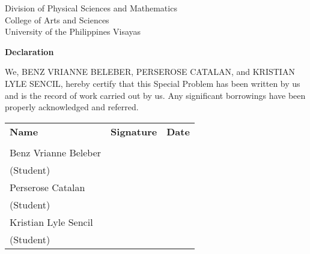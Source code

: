 \begin{center}
	Division of Physical Sciences and Mathematics\\
	College of Arts and Sciences\\
	University of the Philippines Visayas 
	
		\textbf{Declaration}
		\end{center}

We,  {BENZ VRIANNE BELEBER}, {PERSEROSE CATALAN}, and {KRISTIAN LYLE SENCIL}, hereby certify that this Special Problem has been written by us  and is the record of work carried out by us. Any significant borrowings have been properly acknowledged and referred.

	\begin{tabular}{lll}
	\bfseries Name  & \bfseries Signature & \bfseries Date\\ \\
	Benz Vrianne Beleber &\signaturerule  & \signaturerule\\ 
	\multicolumn{1}{l}{(Student)} \\ 
	Perserose Catalan &\signaturerule  & \signaturerule\\ 
	\multicolumn{1}{l}{(Student)} \\
	Kristian Lyle Sencil &\signaturerule  & \signaturerule\\ 
\multicolumn{1}{l}{(Student)} \\

\end{tabular}



